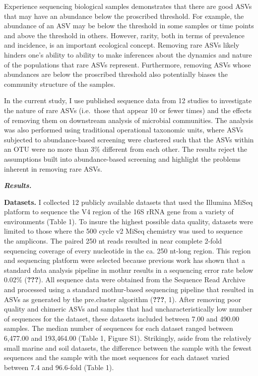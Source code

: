 \documentclass[]{article}
\begin{document}
Experience sequencing biological samples demonstrates that there are
good ASVs that may have an abundance below the proscribed threshold. For
example, the abundance of an ASV may be below the threshold in some
samples or time points and above the threshold in others. However,
rarity, both in terms of prevalence and incidence, is an important
ecological concept. Removing rare ASVs likely hinders one's ability to
ability to make inferences about the dynamics and nature of the
populations that rare ASVs represent. Furthermore, removing ASVs whose
abundances are below the proscribed threshold also potentially biases
the community structure of the samples.

In the current study, I use published sequence data from 12 studies to
investigate the nature of rare ASVs (i.e.~those that appear 10 or fewer
times) and the effects of removing them on downstream analysis of
microbial communities. The analysis was also performed using traditional
operational taxonomic units, where ASVs subjected to abundance-based
screening were clustered such that the ASVs within an OTU were no more
than 3\% different from each other. The results reject the assumptions
built into abundance-based screening and highlight the problems inherent
in removing rare ASVs.

\textbf{\emph{Results.}}

\textbf{Datasets.} I collected 12 publicly available datasets that used
the Illumina MiSeq platform to sequence the V4 region of the 16S rRNA
gene from a variety of environments (Table 1). To insure the highest
possible data quality, datasets were limited to those where the 500
cycle v2 MiSeq chemistry was used to sequence the amplicons. The paired
250 nt reads resulted in near complete 2-fold sequencing coverage of
every nucleotide in the ca. 250 nt-long region. This region and
sequencing platform were selected because previous work has shown that a
standard data analysis pipeline in mothur results in a sequencing error
rate below 0.02\% (\textbf{???}). All sequence data were obtained from
the Sequence Read Archive and processed using a standard mothur-based
sequencing pipeline that resulted in ASVs as generated by the
pre.cluster algorithm (\textbf{???}, 1). After removing poor quality and
chimeric ASVs and samples that had uncharacteristically low number of
sequences for the dataset, these datasets included between 7.00 and
490.00 samples. The median number of sequences for each dataset ranged
between 6,477.00 and 193,464.00 (Table 1, Figure S1). Strikingly, aside
from the relatively small marine and soil datasets, the difference
between the sample with the fewest sequences and the sample with the
most sequences for each dataset varied between 7.4 and 96.6-fold (Table
1).
\end{document}
